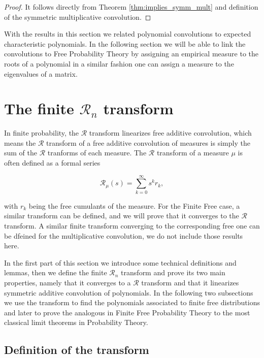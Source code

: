 \begin{proof}
    It follows directly from Theorem \ref{thm:implies_symm_mult} and definition of the symmetric multiplicative convolution.
\end{proof}

With the results in this section we related polynomial convolutions to expected characteristic polynomials. In the following section we will be able to link the convolutions to Free Probability Theory by assigning an empirical measure to the roots of a polynomial in a similar fashion one can assign a measure to the eigenvalues of a matrix.


\section{The finite \texorpdfstring{$\mathcal R_n$}{R} transform} 


In finite probability, the $\mathcal R$ transform linearizes free additive convolution, which means the $\mathcal R$ transform of a free additive convolution of measures is simply the sum of the $\mathcal R$ tranforms of each measure. The $\mathcal R$ transform of a measure $\mu$ is often defined as a formal series

\begin{equation*}
    \mathcal R_\mu(s) = \sum_{k=0}^\infty s^{k} r_k,
\end{equation*}

\noindent with $r_k$ being the free cumulants of the measure. For the Finite Free case, a similar transform can be defined, and we will prove that it converges to the $\mathcal R$ transform. A similar finite transform converging to the corresponding free one can be dfeined for the multiplicative convolution, we do not include those results here. 

In the first part of this section we introduce some technical definitions and lemmas, then we define the finite $\mathcal R_n$ transform and prove its two main properties, namely that it converges to a $\mathcal R$ transform and that it linearizes symmetric additive convolution of polynomials. In the following two subsections we use the transform to find the polynomials associated to finite free distributions and later to prove the analogous in Finite Free Probability Theory to the most classical limit theorems in Probability Theory.

\subsection{Definition of the transform}

